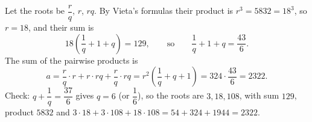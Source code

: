 Let the roots be $\dfrac rq$, $r$, $rq$. By Vieta's formulas their product is $r^3=5832=18^3$, so $r=18$, and their sum is
\[18\left(\dfrac1q+1+q\right)=129,\qquad\text{so}\qquad\dfrac1q+1+q=\dfrac{43}{6}.\]
The sum of the pairwise products is
\[a=\dfrac rq\cdot r+r\cdot rq+\dfrac rq\cdot rq=r^2\left(\dfrac1q+q+1\right)=324\cdot\dfrac{43}{6}=\boxed{2322}.\]
Check: $q+\dfrac1q=\dfrac{37}{6}$ gives $q=6$ (or $\dfrac16$), so the roots are $3,18,108$, with sum $129$, product $5832$ and $3\cdot18+3\cdot108+18\cdot108=54+324+1944=2322$.
